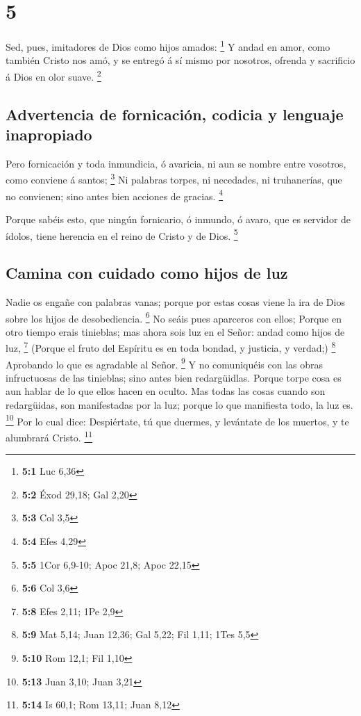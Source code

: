 \hypertarget{section-4}{%
\section{5}\label{section-4}}

 Sed, pues, imitadores de Dios como hijos amados:
\footnote{\textbf{5:1} Luc 6,36}  Y andad en amor, como
también Cristo nos amó, y se entregó á sí mismo por nosotros, ofrenda y
sacrificio á Dios en olor suave. \footnote{\textbf{5:2} Éxod 29,18; Gal
  2,20}

\hypertarget{advertencia-de-fornicaciuxf3n-codicia-y-lenguaje-inapropiado}{%
\subsection{Advertencia de fornicación, codicia y lenguaje
inapropiado}\label{advertencia-de-fornicaciuxf3n-codicia-y-lenguaje-inapropiado}}

 Pero fornicación y toda inmundicia, ó avaricia, ni aun se
nombre entre vosotros, como conviene á santos; \footnote{\textbf{5:3}
  Col 3,5}  Ni palabras torpes, ni necedades, ni
truhanerías, que no convienen; sino antes bien acciones de gracias.
\footnote{\textbf{5:4} Efes 4,29}

 Porque sabéis esto, que ningún fornicario, ó inmundo, ó
avaro, que es servidor de ídolos, tiene herencia en el reino de Cristo y
de Dios. \footnote{\textbf{5:5} 1Cor 6,9-10; Apoc 21,8; Apoc 22,15}

\hypertarget{camina-con-cuidado-como-hijos-de-luz}{%
\subsection{Camina con cuidado como hijos de
luz}\label{camina-con-cuidado-como-hijos-de-luz}}

 Nadie os engañe con palabras vanas; porque por estas cosas
viene la ira de Dios sobre los hijos de desobediencia. \footnote{\textbf{5:6}
  Col 3,6}  No seáis pues aparceros con ellos; 
Porque en otro tiempo erais tinieblas; mas ahora sois luz en el Señor:
andad como hijos de luz, \footnote{\textbf{5:8} Efes 2,11; 1Pe 2,9}
 (Porque el fruto del Espíritu es en toda bondad, y
justicia, y verdad;) \footnote{\textbf{5:9} Mat 5,14; Juan 12,36; Gal
  5,22; Fil 1,11; 1Tes 5,5}  Aprobando lo que es agradable
al Señor. \footnote{\textbf{5:10} Rom 12,1; Fil 1,10}  Y no
comuniquéis con las obras infructuosas de las tinieblas; sino antes bien
redargüidlas.  Porque torpe cosa es aun hablar de lo que
ellos hacen en oculto.  Mas todas las cosas cuando son
redargüidas, son manifestadas por la luz; porque lo que manifiesta todo,
la luz es. \footnote{\textbf{5:13} Juan 3,10; Juan 3,21} 
Por lo cual dice: Despiértate, tú que duermes, y levántate de los
muertos, y te alumbrará Cristo. \footnote{\textbf{5:14} Is 60,1; Rom
  13,11; Juan 8,12}

